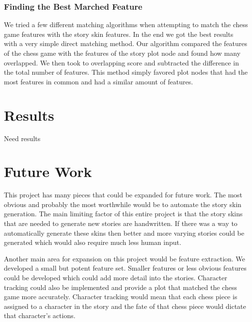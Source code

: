 \documentclass[journal]{./IEEEtran}
\begin{document}
\subsubsection{Finding the Best Marched Feature}
We tried a few different matching algorithms when attempting to match the chess game features with the story skin features. In the end we got the best results with a very simple direct matching method. Our algorithm compared the features of the chess game with the features of the story plot node and found how many overlapped. We then took to overlapping score and subtracted the difference in the total number of features. This method simply favored plot nodes that had the most features in common and had a similar amount of features.

\section{Results}
Need results

\section{Future Work}
This project has many pieces that could be expanded for future work. The most obvious and probably the most worthwhile would be to automate the story skin generation. The main limiting factor of this entire project is that the story skins that are needed to generate new stories are handwritten. If there was a way to automatically generate these skins then better and more varying stories could be generated which would also require much less human input.

Another main area for expansion on this project would be feature extraction. We developed a small but potent feature set. Smaller features or less obvious features could be developed which could add more detail into the stories. Character tracking could also be implemented and provide a plot that matched the chess game more accurately. Character tracking would mean that each chess piece is assigned to a character in the story and the fate of that chess piece would dictate that character’s actions.
\end{document}
